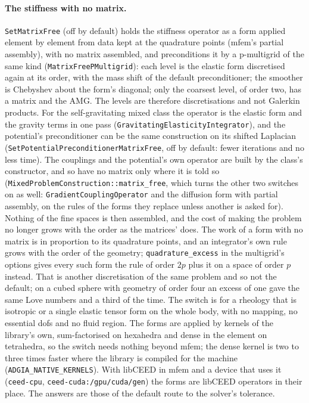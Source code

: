\documentclass[11pt]{article}
\numberwithin{equation}{section}
\theoremstyle{remark}
\newcommand{\code}[1]{\texttt{#1}}
\begin{document}
\paragraph{The stiffness with no matrix.} \code{SetMatrixFree} (off by
default) holds the stiffness operator as a form applied element by element
from data kept at the quadrature points (mfem's partial assembly), with no
matrix assembled, and preconditions it by a p-multigrid of the same kind
(\code{MatrixFreePMultigrid}): each level is the elastic form
discretised again at its order, with the mass shift of the default
preconditioner; the smoother is Chebyshev about the form's diagonal; only
the coarsest level, of order two, has a matrix and the AMG. The levels are
therefore discretisations and not Galerkin products. For the
self-gravitating mixed class the operator is the elastic form and the
gravity terms in one pass (\code{GravitatingElasticityIntegrator}), and
the potential's preconditioner can be the same construction on its
shifted Laplacian (\code{SetPotentialPreconditionerMatrixFree}, off by
default: fewer iterations and no less time). The couplings and the
potential's own operator are built by the class's constructor, and so
have no matrix only where it is told so
(\code{MixedProblemConstruction::matrix\_free}, which turns the other
two switches on as well: \code{GradientCouplingOperator} and the
diffusion form with partial assembly, on the rules of the forms they
replace unless another is asked for). Nothing of the fine spaces is then
assembled, and the cost of making the problem no longer grows with the
order as the matrices' does. The work of a form with no matrix is in
proportion to its quadrature points, and an integrator's own rule grows
with the order of the geometry; \code{quadrature\_excess} in the
multigrid's options gives every such form the rule of order $2p$ plus
it on a space of order $p$ instead. That is another discretisation of
the same problem and so not the default; on a cubed sphere with
geometry of order four an excess of one gave the same Love numbers and
a third of the time. The switch is for a rheology that is isotropic or a single
elastic tensor form on the whole body, with no mapping, no essential
dofs and no fluid region. The forms are applied by kernels of the
library's own, sum-factorised on hexahedra and dense in the element on
tetrahedra, so the switch needs nothing beyond mfem; the dense kernel is
two to three times faster where the library is compiled for the machine
(\code{ADGIA\_NATIVE\_KERNELS}). With libCEED in mfem and a device that
uses it (\code{ceed-cpu}, \code{ceed-cuda:/gpu/cuda/gen}) the forms are
libCEED operators in their place. The answers are those of the default route to the solver's
tolerance.
\end{document}
